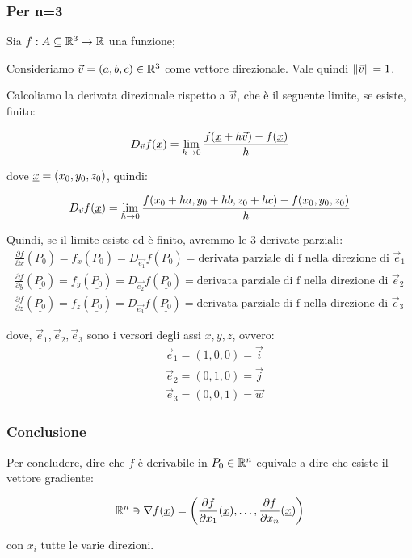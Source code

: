 \subsubsection*{Per n=3}

Sia \(f: A \subseteq \mathbb{R}^{3} \rightarrow \mathbb{R} \) una funzione;

Consideriamo \(\vec{v} = (a,b,c) \in \mathbb{R}^{3}\) come vettore direzionale. Vale quindi \(\left\lVert\vec{v}\right\rVert =1\).

Calcoliamo la derivata direzionale rispetto a \(\vec{v}\), che è il seguente limite, se esiste, finito:

\[
    D_{\vec{v}} f(\underline{x} ) = \lim_{ h \to 0 } \frac{f(\underline{x} + h \vec{v} ) -f(\underline{x} )}{h}
\]

dove \(\underline{x} = (x_0,y_0,z_0)\), quindi:

\[
    D_{\vec{v}} f(\underline{x} ) = \lim_{ h \to 0 } \frac{f(x_0+ha,y_0+hb,z_0+hc) - f(x_0,y_0,z_0)}{h}
\]

Quindi, se il limite esiste ed è finito, avremmo le 3 derivate parziali:
\begin{align*}
    \frac{\partial f}{\partial x}(\underline{P_0}) = f_x(\underline{P_0}) = D_{\vec{e_1}}f(\underline{P_0}) = \text{derivata parziale di f nella direzione di } \vec{e}_1 \\[3mm]
    \frac{\partial f}{\partial y}(\underline{P_0}) = f_y(\underline{P_0}) = D_{\vec{e_2}}f(\underline{P_0}) = \text{derivata parziale di f nella direzione di } \vec{e}_2 \\[3mm]
    \frac{\partial f}{\partial z}(\underline{P_0}) = f_z(\underline{P_0}) = D_{\vec{e_3}}f(\underline{P_0}) = \text{derivata parziale di f nella direzione di } \vec{e}_3
\end{align*}

dove, \(\vec{e}_1, \vec{e}_2, \vec{e}_3\) sono i versori degli assi \(x,y,z\), ovvero:
\begin{align*}
     & \vec{e}_1 = (1,0,0) = \vec{i} \\
     & \vec{e}_2 = (0,1,0) = \vec{j} \\
     & \vec{e}_3 = (0,0,1) = \vec{w}
\end{align*}

\subsubsection*{Conclusione}

Per concludere, dire che \(f\) è derivabile in \(P_0 \in \mathbb{R}^{n} \) equivale a dire che esiste il vettore gradiente:

\[
    \mathbb{R}^{n} \ni \nabla f(\underline{x}) = \left( \frac{\partial f}{\partial x_1}(\underline{x}), \ldots, \frac{\partial f}{\partial x_n}(\underline{x}) \right)
\]

con \(x_i\) tutte le varie direzioni.
